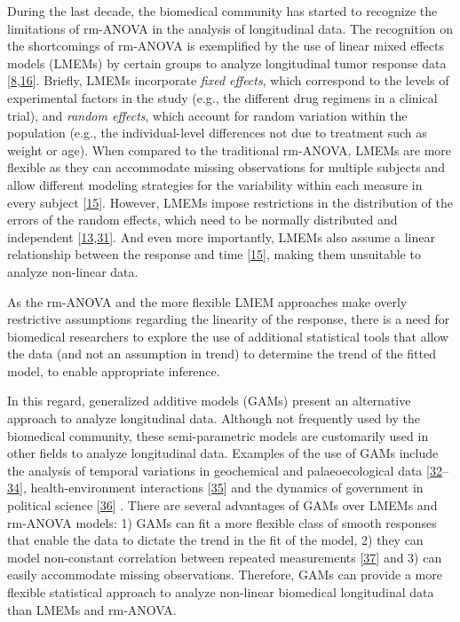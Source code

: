 \documentclass[
]{article}
\begin{document}
During the last decade, the biomedical community has started to recognize the limitations of rm-ANOVA in the analysis of longitudinal data. The recognition on the shortcomings of rm-ANOVA is exemplified by the use of linear mixed effects models (LMEMs) by certain groups to analyze longitudinal tumor response data {[}\protect\hyperlink{ref-skala2010}{8},\protect\hyperlink{ref-vishwanath2009}{16}{]}. Briefly, LMEMs incorporate \emph{fixed effects}, which correspond to the levels of experimental factors in the study (e.g., the different drug regimens in a clinical trial), and \emph{random effects}, which account for random variation within the population (e.g., the individual-level differences not due to treatment such as weight or age). When compared to the traditional rm-ANOVA, LMEMs are more flexible as they can accommodate missing observations for multiple subjects and allow different modeling strategies for the variability within each measure in every subject {[}\protect\hyperlink{ref-pinheiro2006}{15}{]}. However, LMEMs impose restrictions in the distribution of the errors of the random effects, which need to be normally distributed and independent {[}\protect\hyperlink{ref-gueorguieva2004}{13},\protect\hyperlink{ref-barr2013}{31}{]}. And even more importantly, LMEMs also assume a linear relationship between the response and time {[}\protect\hyperlink{ref-pinheiro2006}{15}{]}, making them unsuitable to analyze non-linear data.

As the rm-ANOVA and the more flexible LMEM approaches make overly restrictive assumptions regarding the linearity of the response, there is a need for biomedical researchers to explore the use of additional statistical tools that allow the data (and not an assumption in trend) to determine the trend of the fitted model, to enable appropriate inference.

In this regard, generalized additive models (GAMs) present an alternative approach to analyze longitudinal data. Although not frequently used by the biomedical community, these semi-parametric models are customarily used in other fields to analyze longitudinal data. Examples of the use of GAMs include the analysis of temporal variations in geochemical and palaeoecological data {[}\protect\hyperlink{ref-rose2012}{32}--\protect\hyperlink{ref-simpson2018}{34}{]}, health-environment interactions {[}\protect\hyperlink{ref-yang2012}{35}{]} and the dynamics of government in political science {[}\protect\hyperlink{ref-beck1998}{36}{]} . There are several advantages of GAMs over LMEMs and rm-ANOVA models: 1) GAMs can fit a more flexible class of smooth responses that enable the data to dictate the trend in the fit of the model, 2) they can model non-constant correlation between repeated measurements {[}\protect\hyperlink{ref-wood2017}{37}{]} and 3) can easily accommodate missing observations. Therefore, GAMs can provide a more flexible statistical approach to analyze non-linear biomedical longitudinal data than LMEMs and rm-ANOVA.
\end{document}
